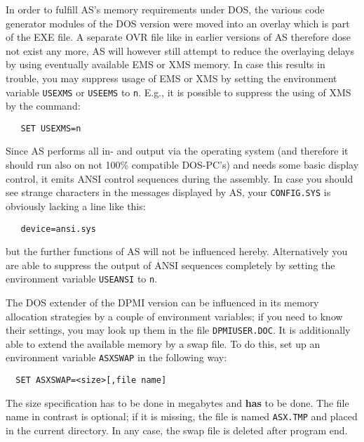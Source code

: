 \documentclass[12pt,twoside]{report}
\newcommand{\bb}[1]{{\bf #1}}
\newcommand{\tty}[1]{{\tt #1}}
\newcommand{\asname}{{AS}}
\begin{document}
In order to fulfill  \asname{}'s memory requirements under
DOS, the various code generator modules of the DOS version were moved into
an overlay which is part of the EXE file.  A separate OVR file like in
earlier versions of \asname{} therefore dose not exist any more, \asname{} will however
still attempt to reduce the overlaying delays by using eventually
available EMS or XMS memory.  In case this results in
trouble, you may suppress usage of EMS or XMS by setting the environment
variable \tty{USEXMS} or \tty{USEEMS} to \tty{n}.  E.g., it is possible to
suppress the using of XMS by the command:
\begin{verbatim}
   SET USEXMS=n
\end{verbatim}
Since \asname{} performs all in- and output via the operating system (and
therefore it should run also on not 100\% compatible DOS-PC's) and
needs some basic display control, it emits ANSI control sequences
during the assembly.
In case you  should see strange characters in the
messages displayed by \asname{}, your \tty{CONFIG.SYS} is obviously lacking a
line like this:
\begin{verbatim}
   device=ansi.sys
\end{verbatim}
but the further  functions of \asname{} will not be
influenced hereby.  Alternatively you are able to suppress the output of
ANSI sequences completely by setting the environment variable
\tty{USEANSI} to \tty{n}.

The DOS extender of the DPMI version  can be
influenced in its memory allocation strategies by a couple of environment
variables; if you need to know their settings, you may look up them in the
file \tty{DPMIUSER.DOC}.  It is additionally able to extend the available
memory by a swap file.  To do this, set up an environment variable
\tty{ASXSWAP} in the following way:
\begin{verbatim}
  SET ASXSWAP=<size>[,file name]
\end{verbatim}
The size specification has to be done in megabytes and \bb{has} to be done.
The file name in contrast is optional; if it is missing, the file is
named \tty{ASX.TMP} and placed in the current directory.  In any case, the
swap file is deleted after program end.
\end{document}
